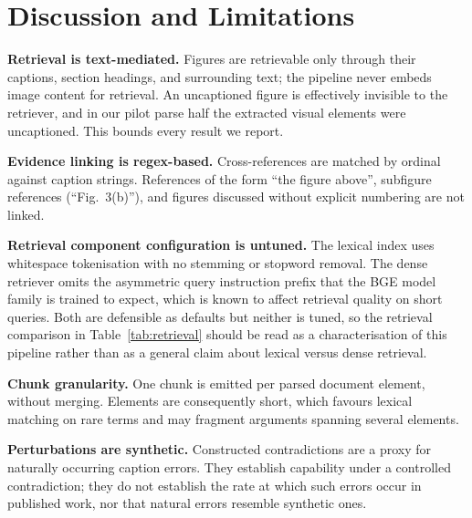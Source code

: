\documentclass[conference]{IEEEtran}
\newif\ifdraftmode
\newcommand{\TODO}[1]{\ifdraftmode\textcolor{red}{\textbf{[TODO: #1]}}\fi}
\begin{document}
\TODO{Report variance. Single-run numbers from a stochastic decoder are not
evidence; run each condition multiple times with fixed seeds where available
and report mean and spread, or state explicitly that decoding is deterministic
at this temperature and show it.}

\section{Discussion and Limitations}

\TODO{Write after Results. The items below are known in advance and must
appear regardless of what the numbers show.}

\textbf{Retrieval is text-mediated.} Figures are retrievable only through
their captions, section headings, and surrounding text; the pipeline never
embeds image content for retrieval. An uncaptioned figure is effectively
invisible to the retriever, and in our pilot parse half the extracted visual
elements were uncaptioned. This bounds every result we report.

\textbf{Evidence linking is regex-based.} Cross-references are matched by
ordinal against caption strings. References of the form ``the figure above'',
subfigure references (``Fig.~3(b)''), and figures discussed without explicit
numbering are not linked.

\textbf{Retrieval component configuration is untuned.} The lexical index uses
whitespace tokenisation with no stemming or stopword removal. The dense
retriever omits the asymmetric query instruction prefix that the BGE model
family is trained to expect, which is known to affect retrieval quality on
short queries. Both are defensible as defaults but neither is tuned, so the
retrieval comparison in Table~\ref{tab:retrieval} should be read as a
characterisation of this pipeline rather than as a general claim about lexical
versus dense retrieval.

\textbf{Chunk granularity.} One chunk is emitted per parsed document element,
without merging. Elements are consequently short, which favours lexical
matching on rare terms and may fragment arguments spanning several elements.

\textbf{Perturbations are synthetic.} Constructed contradictions are a proxy
for naturally occurring caption errors. They establish capability under a
controlled contradiction; they do not establish the rate at which such errors
occur in published work, nor that natural errors resemble synthetic ones.
\TODO{If feasible, include even a small set of naturally occurring
caption--figure discrepancies. A handful of real cases substantially
strengthens the paper's external validity.}
\end{document}
